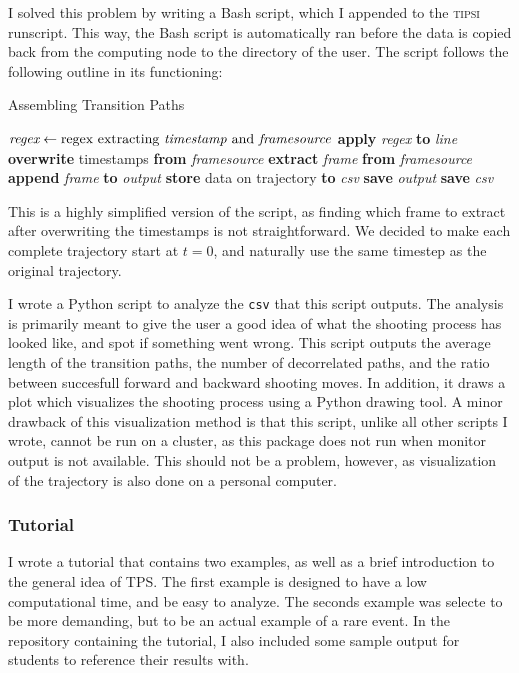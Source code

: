 \documentclass[]{article}
\begin{document}
I solved this problem by writing a Bash script, which I appended to the \textsc{tipsi} runscript. This way, the Bash script is automatically ran before the data is copied back from the computing node to the directory of the user. The script follows the following outline in its functioning:
%
\begin{algorithm}
\caption{Assembling Transition Paths}\label{euclid}
\begin{algorithmic}[1]
\State $\textit{regex} \gets \text{regex extracting \textit{timestamp} and \textit{framesource}}$
\State \textbf{apply} \textit{regex} \textbf{to} \textit{line}
\State \textbf{overwrite} timestamps \textbf{from} \textit{framesource}
\State \textbf{extract} \textit{frame} \textbf{from} \textit{framesource}
\State \textbf{append} \textit{frame} \textbf{to} \textit{output}
\EndFor
\State \textbf{store} data on trajectory \textbf{to} \textit{csv}
\State \textbf{save} \textit{output}
\EndFor
\State \textbf{save} \textit{csv}
\end{algorithmic}
\end{algorithm}
%
This is a highly simplified version of the script, as finding which frame to extract after overwriting the timestamps is not straightforward. We decided to make each complete trajectory start at $t=0$, and naturally use the same timestep as the original trajectory.

I wrote a Python script to analyze the \texttt{csv} that this script outputs. The analysis is primarily meant to give the user a good idea of what the shooting process has looked like, and spot if something went wrong. This script outputs the average length of the transition paths, the number of decorrelated paths, and the ratio between succesfull forward and backward shooting moves. In addition, it draws a plot which visualizes the shooting process using a Python drawing tool. A minor drawback of this visualization method is that this script, unlike all other scripts I wrote, cannot be run on a cluster, as this package does not run when monitor output is not available. This should not be a problem, however, as visualization of the trajectory is also done on a personal computer.

\subsubsection*{Tutorial}

I wrote a tutorial that contains two examples, as well as a brief introduction to the general idea of TPS. The first example is designed to have a low computational time, and be easy to analyze. The seconds example was selecte to be more demanding, but to be an actual example of a rare event. In the repository containing the tutorial, I also included some sample output for students to reference their results with.
\end{document}
